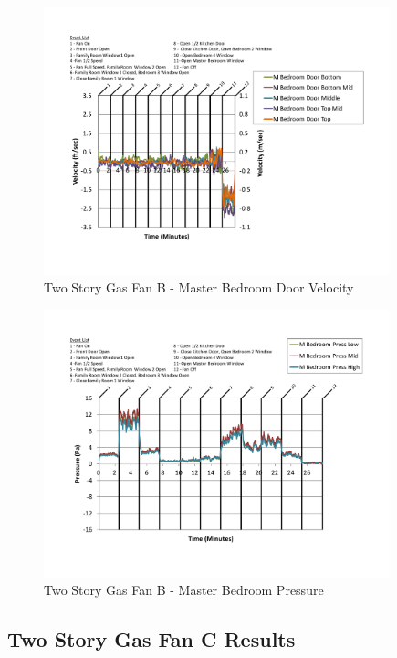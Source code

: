 \documentclass{article}
\begin{document}
\begin{appendices}
	\begin{figure}[H]
		\centering
		\includegraphics[height=3.05in,trim=0.67in 1.1in 0.67in 0.8in,clip=true]{0_Images/Results_Charts/ColdFlow/Two_Story/Gas/B/Master_Bedroom_Door_Velocity.pdf}
		\caption{Two Story Gas Fan B - Master Bedroom Door Velocity}
	\end{figure}
 

	\begin{figure}[H]
		\centering
		\includegraphics[height=3.05in,trim=0.67in 1.1in 0.67in 0.8in,clip=true]{0_Images/Results_Charts/ColdFlow/Two_Story/Gas/B/Master_Bedroom_Pressure.pdf}
		\caption{Two Story Gas Fan B - Master Bedroom Pressure}
	\end{figure}
 
	\clearpage

		\clearpage
\clearpage		\large
\subsection{Two Story Gas Fan C Results} \label{App:Two_StoryGasFanCResults} 


\end{appendices}
\end{document}
